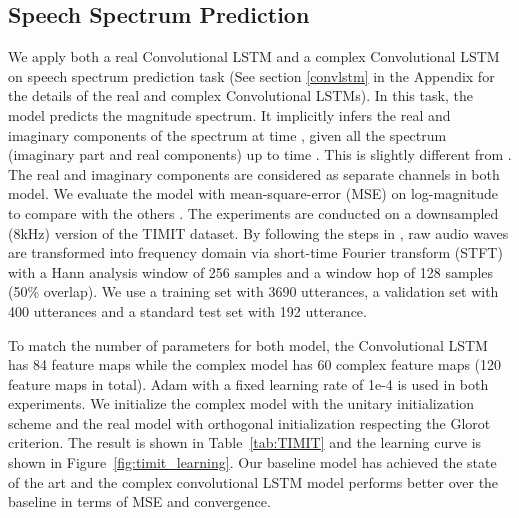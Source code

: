 \documentclass{article}
\begin{document}
\subsection{Speech Spectrum Prediction}
\label{sec:timit_results}
We apply both a real Convolutional LSTM \citet{xingjian2015convolutional} and a complex Convolutional LSTM on speech spectrum prediction task (See section \ref{convlstm} in the Appendix for the details of the real and complex Convolutional LSTMs). In this task, the model predicts the magnitude spectrum. It implicitly infers the real and imaginary components of the spectrum at time , given all the spectrum (imaginary part and real components) up to time . This is slightly different from \citep{wisdom2016full}. The real and imaginary components are considered as separate channels in both model. We evaluate the model with mean-square-error (MSE) on log-magnitude to compare with the others \citet{wisdom2016full}. The experiments are conducted on a downsampled (8kHz) version of the TIMIT dataset. By following the steps in \cite{wisdom2016full}, raw audio waves are transformed into frequency domain via short-time Fourier transform (STFT) with a Hann analysis window of 256 samples and a window hop of 128 samples (50\% overlap). We use a training set with 3690 utterances, a validation set with 400 utterances and a standard test set with 192 utterance. 

To match the number of parameters for both model, the Convolutional LSTM has 84 feature maps while the complex model has 60 complex feature maps (120 feature maps in total). Adam \cite{kingma2014adam} with a fixed learning rate of 1e-4 is used in both experiments. We initialize the complex model with the unitary initialization scheme and the real model with orthogonal initialization respecting the Glorot criterion. The result is shown in Table~\ref{tab:TIMIT} and the learning curve is shown in Figure~\ref{fig:timit_learning}. Our baseline model has achieved the state of the art and the complex convolutional LSTM model performs better over the baseline in terms of MSE and convergence. 
\end{document}
